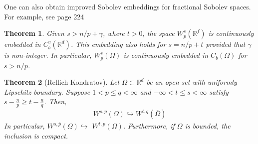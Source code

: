\documentclass[
    a4paper,
    DIV=14,
    abstract=true,
    numbers=noenddot
]
{scrartcl}
\newtheorem{theorem}{Theorem}[section]
\theoremstyle{definition}
\newcommand{\R}{\mathbb{R}}
\begin{document}
One can also obtain improved Sobolev embeddings for fractional Sobolev spaces. For example, see \cite{agranovich2015sobolev} page 224
\begin{theorem}
  Given $s>n / p + \gamma $,
  where $t>0$, the space $W_p^s\left(\mathbb{R}^f\right)$ is continuously embedded in $C_b^\gamma \left(\mathbb{R}^d\right)$. This embedding also holds for $s=n / p+t$ provided that $\gamma $ is non-integer.
  In particular, $W_p^s\left(\Omega\right)$ is continuously embedded in $C_b\left(\Omega\right)$ for $s>n / p$.
\end{theorem}
\begin{theorem}[Rellich Kondratov]\label{sobolev embeddings}
  Let $\Omega \subset \R^d$ be an open set with uniformly Lipschitz boundary.
  Suppose $1<p \leq q<\infty$ and $-\infty<t \leq s<\infty$ satisfy $s-\frac{n}{p} \geq t-\frac{n}{q}$. Then,
  \begin{align*}
    W^{s, p}\left(\Omega\right) \hookrightarrow W^{t, q}\left(\overline\Omega\right)
  \end{align*}
  In particular, $W^{s, \bar{p}}\left(\Omega\right) \hookrightarrow$ $W^{t, p}\left(\Omega\right)$. Furthermore, if $\Omega $ is bounded, the inclusion is compact.

\end{theorem}






\end{document}
